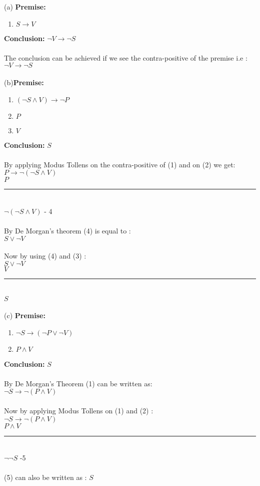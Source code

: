 \documentclass{article}
\begin{document}
(a) \textbf{Premise:} \\
\begin{enumerate}
    \item $S \rightarrow V $\\
    \end{enumerate} 
\textbf{Conclusion:}
$ \neg V \rightarrow \neg S $ \\
\\
The conclusion can be achieved if we see the contra-positive of the premise i.e : \\
$ \neg V \rightarrow \neg S $ \\
\\
(b)\textbf{Premise:}
\begin{enumerate} 
\item $(\neg S \wedge V) \rightarrow \neg P$
\item $P$
\item $V$
\end{enumerate}
\textbf{Conclusion:}
$ S $ \\
\\
By applying Modus Tollens on the contra-positive of (1) and on (2) we get: \\
$ P \rightarrow \neg (\neg S \wedge V) $ \\
$ P $ \\
\noindent\rule{1.9cm}{0.4pt}\\
$\neg (\neg S \wedge V) $ - 4 \\
\\
By De Morgan's theorem (4) is equal to : \\
$ S \vee \neg V $ \\
\\
Now by using (4) and (3) : \\
$ S \vee \neg V $ \\
$V$ \\
\noindent\rule{1.9cm}{0.4pt}\\
$ S $ \\
\\
(c) \textbf{Premise:}
\begin{enumerate}
\item $\neg S \rightarrow (\neg P \vee \neg V)$
\item $P \wedge V$
\end{enumerate}
\textbf{Conclusion:}
$ S $ \\
\\
By De Morgan's Theorem (1) can be written as: \\
$\neg S \rightarrow \neg ( P \wedge  V)$ \\
\\
Now by applying Modus Tollens on (1) and (2) : \\
$\neg S \rightarrow \neg ( P \wedge  V)$ \\
$P \wedge V$ \\
\noindent\rule{1.9cm}{0.4pt}\\
$\neg \neg S $ -5 \\
\\
(5) can also be written as : $S$
\end{document}
